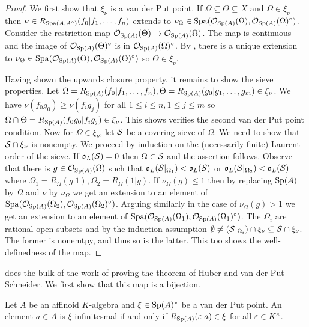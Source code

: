 \begin{proof}
    We first show that $\xi_{\nu}$ is a van der Put point. If $\Omega\subseteq\Theta\subseteq X$ and $\Omega\in\xi_{\nu}$ then $\nu\in R_{\mathrm{Spa}(A,A^{\circ})}(f_{0}|f_{1},\dots,f_{n})$ extends to $\nu_{\Omega}\in\mathrm{Spa}(\mathcal{O}_{\mathrm{Sp}(A)}(\Omega),\mathcal{O}_{\mathrm{Sp}(A)}(\Omega)^{\circ})$. Consider the restriction map $\mathcal{O}_{\mathrm{Sp}(A)}(\Theta)\to\mathcal{O}_{\mathrm{Sp}(A)}(\Omega)$. The map is continuous and the image of $\mathcal{O}_{\mathrm{Sp}(A)}(\Theta)^{\circ}$ is in $\mathcal{O}_{\mathrm{Sp}(A)}(\Omega)^{\circ}$. By , there is a unique extension to $\nu_{\Theta}\in\mathrm{Spa}(\mathcal{O}_{\mathrm{Sp}(A)}(\Theta),\mathcal{O}_{\mathrm{Sp}(A)}(\Theta)^{\circ})$ so $\Theta\in\xi_{\nu}$. 

    Having shown the upwards closure property, it remains to show the sieve properties. Let $\Omega=R_{\mathrm{Sp}(A)}(f_{0}|f_{1},\dots,f_{n}),\Theta=R_{\mathrm{Sp}(A)}(g_{0}|g_{1},\dots,g_{m})\in\xi_{\nu}$. We have $\nu(f_{0}g_{0})\geq\nu(f_{i}g_{j})$ for all $1\leq i\leq n,1\leq j\leq m$ so $\Omega\cap\Theta=R_{\mathrm{Sp}(A)}(f_{0}g_{0}|f_{i}g_{j})\in\xi_{\nu}$. This shows verifies the second van der Put point condition. Now for $\Omega\in\xi_{\nu}$, let $\mathcal{S}$ be a covering sieve of $\Omega$. We need to show that $\mathcal{S}\cap\xi_{\nu}$ is nonempty. We proceed by induction on the (necessarily finite) Laurent order of the sieve. If $\mathfrak{o}_{L}(\mathcal{S})=0$ then $\Omega\in\mathcal{S}$ and the assertion follows. Observe that there is $g\in\mathcal{O}_{\mathrm{Sp}(A)}(\Omega)$ such that $\mathfrak{o}_{L}(\mathcal{S}|_{\Omega_{1}})<\mathfrak{o}_{L}(\mathcal{S})$ or $\mathfrak{o}_{L}(\mathcal{S}|_{\Omega_{2}})<\mathfrak{o}_{L}(\mathcal{S})$ where $\Omega_{1}=R_{\Omega}(g|1),\Omega_{2}=R_{\Omega}(1|g)$. If $\nu_{\Omega}(g)\leq 1$ then by  replacing $\mathrm{Sp}(A)$ by $\Omega$ and $\nu$ by $\nu_{\Omega}$ we get an extension to an element of $\mathrm{Spa}(\mathcal{O}_{\mathrm{Sp}(A)}(\Omega_{2}),\mathcal{O}_{\mathrm{Sp}(A)}(\Omega_{2})^{\circ})$. Arguing similarly in the case of $\nu_{\Omega}(g)>1$ we get an extension to an element of $\mathrm{Spa}(\mathcal{O}_{\mathrm{Sp}(A)}(\Omega_{1}),\mathcal{O}_{\mathrm{Sp}(A)}(\Omega_{1})^{\circ})$. The $\Omega_{i}$ are rational open subsets and by the induction assumption $\emptyset\neq(\mathcal{S}|_{\Omega_{i}})\cap\xi_{\nu}\subseteq\mathcal{S}\cap\xi_{\nu}$. The former is nonemtpy, and thus so is the latter. This too shows the well-definedness of the map. 
\end{proof}
 does the bulk of the work of proving the theorem of Huber and van der Put-Schneider. We first show that this map is a bijection. 
\begin{definition}[$\xi$-Infinitesmal]\label{def: xi-infinitesmal}
    Let $A$ be an affinoid $K$-algebra and $\xi\in\mathrm{Sp}(A)^{*}$ be a van der Put point. An element $a\in A$ is $\xi$-infinitesmal if and only if $R_{\mathrm{Sp}(A)}(\varepsilon|a)\in\xi$ for all $\varepsilon\in K^{\times}$. 
\end{definition} 
